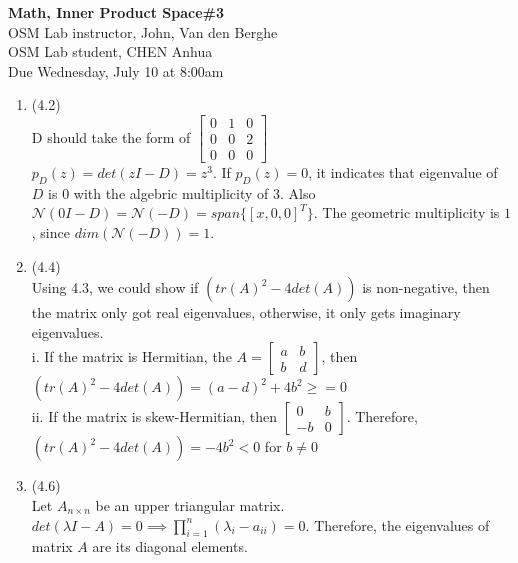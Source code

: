 \documentclass[letterpaper,12pt]{article}
\theoremstyle{definition}
\begin{document}
\begin{flushleft}
   \textbf{\large{Math, Inner Product Space\#3}} \\[5pt]
   OSM Lab instructor, John, Van den Berghe \\[5pt]
   OSM Lab student, CHEN Anhua\\[5pt]
   Due Wednesday, July 10 at 8:00am
\end{flushleft}

\vspace{5mm}


\begin{enumerate}
	\item (4.2)\\
	D should take the form of 
	$\begin{bmatrix}
	   0 & 1 & 0\\
	   0 & 0 & 2\\
	   0 & 0 & 0
	\end{bmatrix} $\\
	$p_{D}(z) = det(zI - D) = z^{3}$. If $p_{D}(z) = 0$, it indicates that eigenvalue of $D$ is $0$ with the algebric multiplicity of 3. Also $\mathcal{N}(0I - D) = \mathcal{N}(-D) = span\{[x, 0, 0]^{T}\}$. The geometric multiplicity is $1$, since $dim(\mathcal{N}(-D)) = 1$.\\
	
	\item(4.4)\\
	Using 4.3, we could show if $(tr(A)^{2} - 4det(A))$ is non-negative, then the matrix only got real eigenvalues, otherwise, it only gets imaginary eigenvalues.\\
	i. If the matrix is Hermitian, the $A =\begin{bmatrix}
	   a & b \\
	   b & d 
	\end{bmatrix}  $, then $(tr(A)^{2} - 4det(A)) = (a - d)^{2} + 4b^{2} \geq = 0$\\
	ii. If the matrix is skew-Hermitian, then $\begin{bmatrix}
	   0 & b \\
	   -b & 0 
	\end{bmatrix} $. Therefore, $(tr(A)^{2} - 4det(A)) = -4b^{2} < 0$ for $b \neq 0$\\
	
	
	\item(4.6)\\
	Let $A_{n \times n}$ be an upper triangular matrix. $det(\lambda I - A) = 0 \implies \prod_{i = 1}^{n}(\lambda_{i} - a_{ii}) = 0$. Therefore, the eigenvalues of matrix $A$ are its diagonal elements.\\
	

\end{enumerate}
\end{document}

